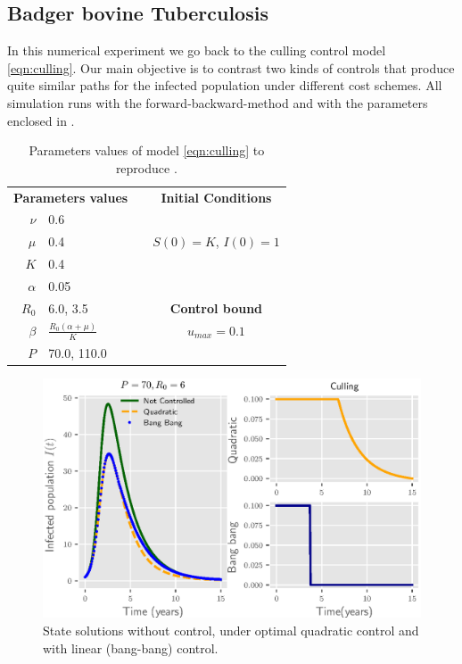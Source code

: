 \subsection*{Badger bovine Tuberculosis}
In this numerical experiment we go back to the culling control model
\eqref{eqn:culling}. Our main objective is to contrast two kinds of controls that produce quite similar paths for the infected population under different cost schemes. All simulation runs with the 
forward-backward-method and with the parameters enclosed in 
.


\begin{table}[H]
  \begin{center}
    \begin{tabular}{@{}rllc@{}}
      \toprule
      \multicolumn{2}{c}{\textbf{Parameters values}}
      &&
      \textbf{Initial Conditions}
      \\
      \cmidrule{1-2}
      \cmidrule{4-4}
      $\nu$
        & \num{0.6}
      \\
      $\mu$
        & \num{0.4}
        &&  
          $S(0) = K$, 
          $I(0) = 1$
      \\
      $K$
        & \num{0.4}
      \\
      $\alpha$
        & \num{0.05}
      \\
      $R_0$
        & \num{6.0}, \num{3.5}
        && 
          \textbf{Control bound}
      \\
      \cmidrule{4-4}
      $\beta$
        &
         $
          \displaystyle
          \frac{R_0(\alpha + \mu)}{K}
         $
        &&
          $u_{max} = \num{0.1}$
      \\
      $P$
        & \num{70.0}, \num{110.0}
      \\
      \bottomrule
    \end{tabular}
  \end{center}
  \caption{Parameters values of model \eqref{eqn:culling} to reproduce 
  .}
  \label{tbl:culling_par}
\end{table}

\begin{figure}[H]
  \centering
  \includegraphics{Figures/figure_1_culling}
  \caption{State solutions without control, under optimal quadratic control 
  and with linear (bang-bang) control.}
  \label{fig:figure1culling}
\end{figure}

